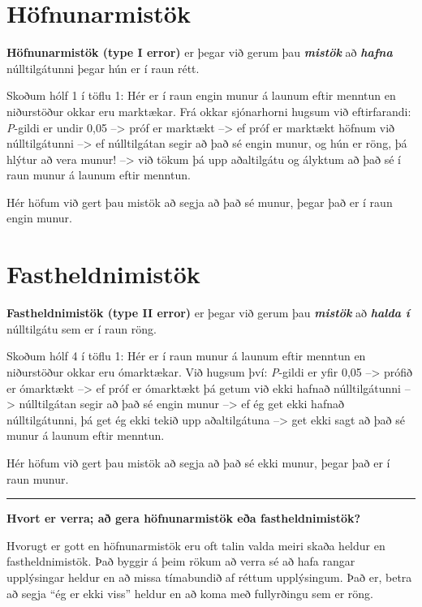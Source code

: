 \documentclass[
]{book}
\begin{document}
\hypertarget{huxf6fnunarmistuxf6k}{%
\section{Höfnunarmistök}\label{huxf6fnunarmistuxf6k}}

\textbf{Höfnunarmistök (type I error)} er þegar við gerum þau \textbf{\emph{mistök}} að \textbf{\emph{hafna}} núlltilgátunni þegar hún er í raun rétt.

Skoðum hólf 1 í töflu 1: Hér er í raun engin munur á launum eftir menntun en niðurstöður okkar eru marktækar. Frá okkar sjónarhorni hugsum við eftirfarandi: \emph{P}-gildi er undir 0,05 --\textgreater{} próf er marktækt --\textgreater{} ef próf er marktækt höfnum við núlltilgátunni --\textgreater{} ef núlltilgátan segir að það sé engin munur, og hún er röng, þá hlýtur að vera munur! --\textgreater{} við tökum þá upp aðaltilgátu og ályktum að það sé í raun munur á launum eftir menntun.

Hér höfum við gert þau mistök að segja að það sé munur, þegar það er í raun engin munur.

\hypertarget{fastheldnimistuxf6k}{%
\section{Fastheldnimistök}\label{fastheldnimistuxf6k}}

\textbf{Fastheldnimistök (type II error)} er þegar við gerum þau \textbf{\emph{mistök}} að \textbf{\emph{halda í}} núlltilgátu sem er í raun röng.

Skoðum hólf 4 í töflu 1: Hér er í raun munur á launum eftir menntun en niðurstöður okkar eru ómarktækar. Við hugsum því: \emph{P}-gildi er yfir 0,05 --\textgreater{} prófið er ómarktækt --\textgreater{} ef próf er ómarktækt þá getum við ekki hafnað núlltilgátunni --\textgreater{} núlltilgátan segir að það sé engin munur --\textgreater{} ef ég get ekki hafnað núlltilgátunni, þá get ég ekki tekið upp aðaltilgátuna --\textgreater{} get ekki sagt að það sé munur á launum eftir menntun.

Hér höfum við gert þau mistök að segja að það sé ekki munur, þegar það er í raun munur.

\begin{center}\rule{0.5\linewidth}{0.5pt}\end{center}

\textbf{Hvort er verra; að gera höfnunarmistök eða fastheldnimistök?}

Hvorugt er gott en höfnunarmistök eru oft talin valda meiri skaða heldur en fastheldnimistök. Það byggir á þeim rökum að verra sé að hafa rangar upplýsingar heldur en að missa tímabundið af réttum upplýsingum. Það er, betra að segja ``ég er ekki viss'' heldur en að koma með fullyrðingu sem er röng.
\end{document}
